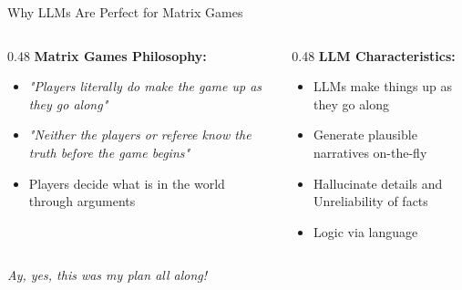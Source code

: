 \documentclass[aspectratio=169]{beamer}
\begin{document}
\begin{frame}{Why LLMs Are Perfect for Matrix Games}
  \begin{columns}[T]
    \begin{column}{0.48\textwidth}
      \textbf{Matrix Games Philosophy:}
      \begin{itemize}
        \item \textit{"Players literally do make the game up as they go along"}
        \item \textit{"Neither the players or referee know the truth before the game begins"}
        \item Players decide what is in the world through arguments
      \end{itemize}
    \end{column}

    \begin{column}{0.48\textwidth}
      \textbf{LLM Characteristics:}
      \begin{itemize}
        \item LLMs make things up as they go along
        \item Generate plausible narratives on-the-fly
        \item Hallucinate details and Unreliability of facts
        \item Logic via language
      \end{itemize}
    \end{column}
  \end{columns}

  \vspace{1em}
  \centering
  \large
  \textit{Ay, yes, this was my plan all along!}
\end{frame}
\end{document}
